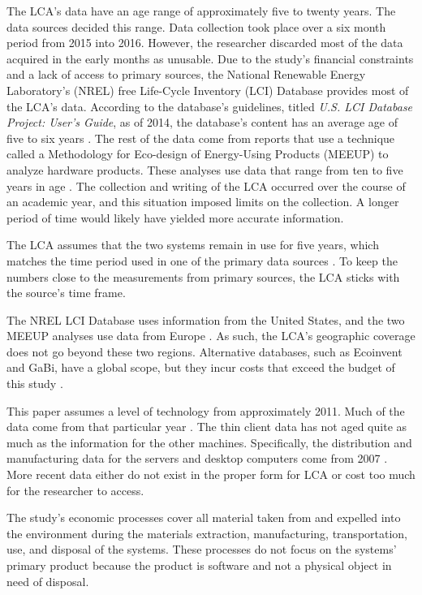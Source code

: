 \documentclass[final,journal,10pt,letterpaper,oneside,twocolumn,compsoc]%
{IEEEtran}
\begin{document}
The LCA's data have an age range of approximately five to twenty years. The
data sources decided this range. Data
collection took place over a six month period from 2015 into 2016. However, the
researcher discarded
most of the data acquired in the early months as unusable. Due to the study's
financial constraints and a
lack of access to primary sources, the National Renewable Energy Laboratory's
(NREL) free Life-Cycle Inventory (LCI) Database provides most of the LCA's
data. According to the database's guidelines, titled \textit{U.S. LCI Database
Project: User's Guide}, as of 2014, the database's content has an average age
of five to six years
\cite{database}. The rest of the data come from reports that use a technique
called a Methodology for Eco-design of Energy-Using Products (MEEUP) to analyze
hardware products. These analyses use data that
range from ten to five years in age \cite{client} \cite{desktop}. The collection
and writing
of the LCA occurred over the course of an academic year, and this situation
imposed limits on the collection. A longer period of time would likely have
yielded more accurate information.

The LCA assumes that the two systems remain in use for five years, which
matches the time period used in one of the primary data sources \cite{client}.
To keep the numbers close to the measurements from primary sources, the LCA
sticks with the source's time frame.

The NREL LCI Database uses information from the United States, and
the two MEEUP analyses use data from Europe \cite{database} \cite{client}
\cite{desktop}. As
such, the LCA's geographic coverage does not go beyond these two regions.
Alternative databases, such as Ecoinvent and GaBi, have a global scope, but they
incur costs that exceed the budget of this study \cite{textbook}.

This paper assumes a level of technology from approximately 2011. Much of the
data come
from that particular year \cite{client}. The thin client data has not aged quite
as much as
the information for the other machines. Specifically, the distribution and
manufacturing data for the
servers and desktop computers come from 2007 \cite{desktop}. More recent data
either do not exist in the proper form for LCA or cost too much for the
researcher to access.

The study's economic processes cover all material taken from and expelled into
the environment during the materials extraction, manufacturing, transportation,
use, and disposal of the systems. These
processes do not focus on the systems' primary product because the product is
software and not a physical object in need of disposal.
\end{document}
